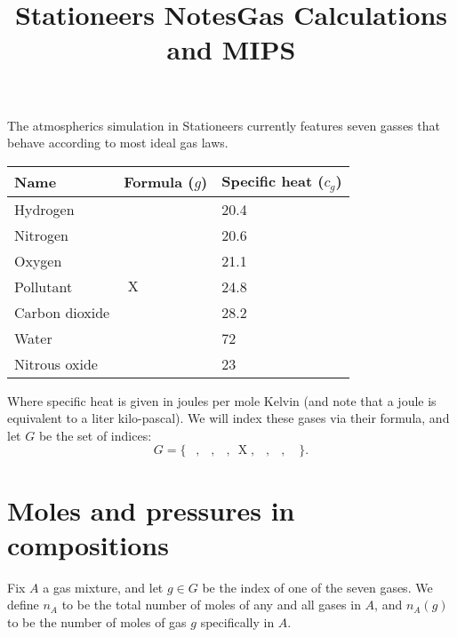 \documentclass{article}
\title{Stationeers Notes}
\DeclareMathOperator{\moles}{\mathrm{mol}}
\DeclareMathOperator{\Hyd}{\mathrm{H}_2}
\DeclareMathOperator{\Nit}{\mathrm{N}_2}
\DeclareMathOperator{\Ox}{\mathrm{O}_2}
\DeclareMathOperator{\Pol}{\mathrm{X}}
\DeclareMathOperator{\CDiox}{\mathrm{CO}_2}
\DeclareMathOperator{\Water}{\mathrm{H}_2\mathrm{O}}
\DeclareMathOperator{\NiOx}{\mathrm{N}_2\mathrm{O}}
\begin{document}
\title{Gas Calculations and MIPS}

\maketitle{}

The atmospherics simulation in Stationeers currently features seven
gasses that behave according to most ideal gas laws.

\begin{center}
    \begin{tabular}{*3l}
        \toprule
        Name & Formula ($g$) & Specific heat ($c_g$) \\
        \midrule
        Hydrogen & $\Hyd$ & 20.4 \\
        Nitrogen & $\Nit$ & 20.6 \\
        Oxygen & $\Ox$ & 21.1 \\
        Pollutant & $\Pol$ & 24.8 \\
        Carbon dioxide & $\CDiox$ & 28.2 \\
        Water & $\Water$ & 72 \\
        Nitrous oxide & $\NiOx$ & 23 \\
        \bottomrule
    \end{tabular}
\end{center}
Where specific heat is given in joules per mole Kelvin
(and note that a joule is equivalent to a liter kilo-pascal).
We will index these gases via their formula, and let $G$ be the set of indices:
\[
    G = \{\
        \Hyd,\
        \Nit,\
        \Ox,\
        \Pol,\
        \CDiox,\
        \Water,\
        \NiOx\
    \}.
\]

\section{Moles and pressures in compositions}

Fix $A$ a gas mixture, and let $g\in G$ be the index of one of the seven gases.
We define $n_A$ to be the total number of moles of any and all gases in $A$,
and $n_A(g)$ to be the number of moles of gas $g$ specifically in $A$.

\end{document}
